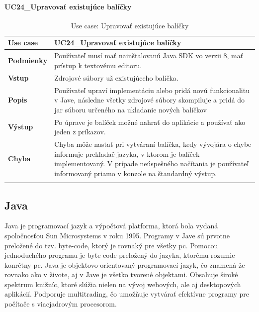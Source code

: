 \paragraph{UC24\_Upravovať existujúce balíčky}
\begin{center}
	\begin{longtable}{|p{2.5cm}|p{12.2cm}|}
		
			\hline
			\textbf{Use case} & UC24\_Upravovať existujúce balíčky \\ 
			\hline
			\textbf{Podmienky} &  Používateľ musí mať nainštalovanú Java SDK vo verzii 8, mať prístup k textovému editoru.  \\ 
			\hline
			\textbf{Vstup} & Zdrojové súbory už existujúceho balíčka.\\
			\hline
			\textbf{Popis} & Používateľ upraví implementáciu alebo pridá novú funkcionalitu v Jave, následne všetky zdrojové súbory skompiluje a pridá do \acrshort{jar} súboru určeného na ukladanie nových balíčkov\\ 
			\hline
			\textbf{Výstup} & Po úprave je balíček možné nahrať do aplikácie a používať ako jeden z príkazov.\\
			\hline
			\textbf{Chyba} & Chyba môže nastať pri vytváraní balíčka, kedy vývojára o chybe informuje prekladač jazyka, v ktorom je balíček implementovaný. V prípade neúspešného načítania je používateľ informovaný priamo v konzole na štandardný výstup.\\
			\hline
		\caption{Use case: Upravovať existujúce balíčky}
		\label{table:1}
		
	\end{longtable}
\end{center}
\subsection{Java}
\indent Java je programovací jazyk a výpočtová platforma, ktorá bola vydaná spoločnosťou Sun Microsystems v roku 1995. \cite{java} 
Programy v Jave sú prvotne preložené do tzv. byte-code, ktorý je rovnaký pre všetky \acrshort{pc}. Pomocou jednoduchého programu je byte-code preložený do jazyka, ktorému rozumie konrétny \acrshort{pc}.
Java je objektovo-orientovaný programovací jazyk, čo znamená že rovnako ako v živote, aj v Jave je všetko tvorené objektami. Obsahuje široké spektrum knižníc, ktoré slúžia nielen na vývoj webových, ale aj desktopových aplikácií. 
Podporuje multitrading, čo umožňuje vytvárať efektívne programy pre počítače s viacjadrovým procesorom.\cite{java}

